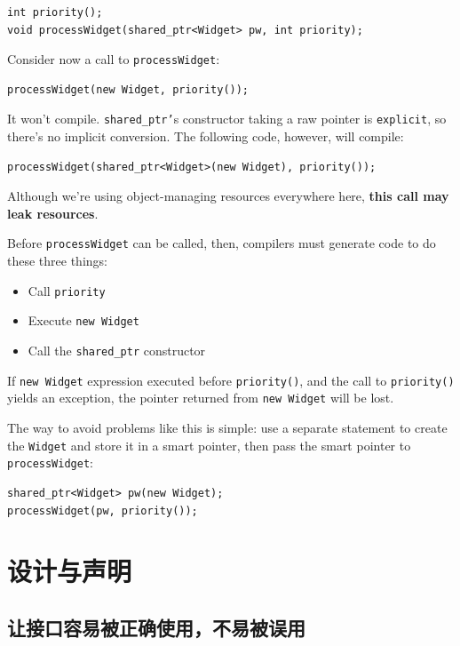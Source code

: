 \documentclass[a4paper,twoside]{article}
\theoremstyle{definition}
\theoremstyle{remark}
\numberwithin{equation}{section}
\let\OldTexttt\texttt
\renewcommand{\texttt}[1]{{\color{blue} \OldTexttt{#1}}}
\begin{document}
\begin{verbatim}
int priority();
void processWidget(shared_ptr<Widget> pw, int priority);
\end{verbatim}

Consider now a call to \texttt{processWidget}:
\begin{verbatim}
processWidget(new Widget, priority());
\end{verbatim}

It won't compile. \texttt{shared\_ptr'}s constructor taking a raw
pointer is \texttt{explicit}, so there's no implicit conversion. The
following code, however, will compile: 
\begin{verbatim}
processWidget(shared_ptr<Widget>(new Widget), priority());
\end{verbatim}

Although we're using object-managing resources everywhere here,
\textbf{this call may leak resources}.

Before \texttt{processWidget} can be called, then, compilers must generate
code to do these three things:
\begin{itemize}
\item Call \texttt{priority}
\item Execute \texttt{new Widget}
\item Call the \texttt{shared\_ptr} constructor
\end{itemize}

If \texttt{new Widget} expression executed before \texttt{priority()},
and  the call to \texttt{priority()} yields an exception, the pointer
returned from \texttt{new Widget} will be lost.

The way to avoid problems like this is simple: use a separate
statement to create the \texttt{Widget} and store it in a smart pointer, then
pass the smart pointer to \texttt{processWidget}:

\begin{verbatim}
shared_ptr<Widget> pw(new Widget); 
processWidget(pw, priority());
\end{verbatim}

\clearpage
\section{设计与声明}

\subsection{让接口容易被正确使用，不易被误用}
\label{sec:Item-18}
\end{document}
